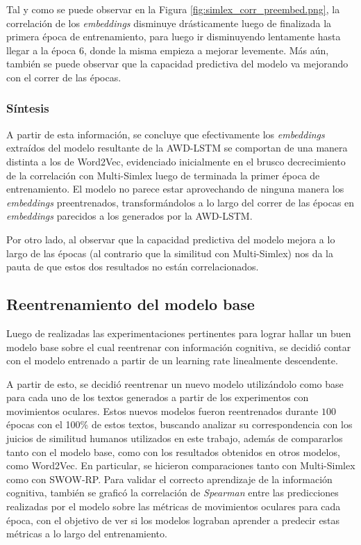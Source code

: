 Tal y como se puede observar en la Figura \ref{fig:simlex_corr_preembed.png}, la correlación de los 
\textit{embeddings} disminuye drásticamente luego de finalizada la primera época 
de entrenamiento, para luego ir disminuyendo lentamente hasta llegar 
a la época $6$, donde la misma empieza a mejorar levemente. Más aún, también 
se puede observar que la capacidad predictiva del modelo va mejorando 
con el correr de las épocas.

\subsubsection{Síntesis}

A partir de esta información, se concluye que efectivamente los \textit{embeddings} 
extraídos del modelo resultante de la AWD-LSTM se comportan de una manera 
distinta a los de Word2Vec, evidenciado inicialmente en el brusco decrecimiento 
de la correlación con Multi-Simlex luego de terminada la primer época de 
entrenamiento. El modelo no parece estar aprovechando de ninguna manera 
los \textit{embeddings} preentrenados, transformándolos a lo largo del correr de 
las épocas en \textit{embeddings} parecidos a los generados por la AWD-LSTM.

Por otro lado, al observar que la capacidad predictiva del modelo mejora a 
lo largo de las épocas (al contrario que la similitud con Multi-Simlex) nos da 
la pauta de que estos dos resultados no están correlacionados.

\subsection{Reentrenamiento del modelo base}

Luego de realizadas las experimentaciones pertinentes para lograr hallar un buen 
modelo base sobre el cual reentrenar con información cognitiva, se decidió contar 
con el modelo entrenado a partir de un learning rate linealmente descendente.

A partir de esto, se decidió reentrenar un nuevo modelo utilizándolo como base 
para cada uno de los textos generados a partir de los experimentos con 
movimientos oculares. Estos nuevos modelos fueron reentrenados durante 
$100$ épocas con el 100\% de estos textos, buscando analizar su correspondencia 
con los juicios de similitud humanos utilizados en este trabajo, además 
de compararlos tanto con el modelo base, como con los resultados obtenidos 
en otros modelos, como Word2Vec. En particular, se hicieron comparaciones 
tanto con Multi-Simlex como con SWOW-RP. Para validar el correcto aprendizaje 
de la información cognitiva, también se graficó la correlación de \textit{Spearman} 
entre las predicciones realizadas por el modelo sobre las métricas de 
movimientos oculares para cada época, con el objetivo de ver si los modelos 
lograban aprender a predecir estas métricas a lo largo del entrenamiento.

